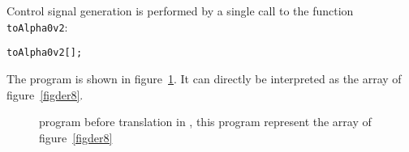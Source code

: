 Control signal generation is performed by a single call to the \mma{}
function {\tt toAlpha0v2}:
\begin{verbatim}
toAlpha0v2[];
\end{verbatim}
The \alphaz{} program is shown in figure~\ref{figder7}. It can directly 
be interpreted as the array of figure~\ref{figder8}. 

\begin{figure}[htbp]

\caption{ {\alphaz} program before translation in {\alphard}, this program 
represent the array of figure~\ref{figder8}}
\label{figder7}
\end{figure}

%
%
%
%
%




